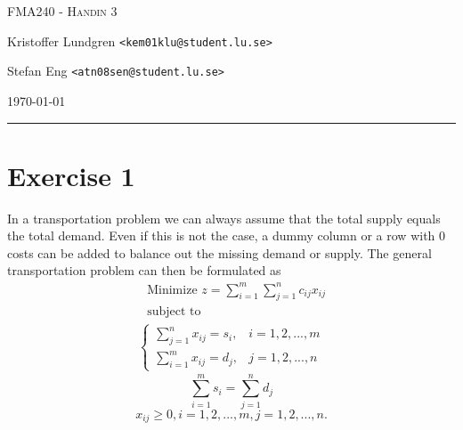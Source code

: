 \documentclass{article}
\begin{document}


\begin{centering}
	{\scshape\Large FMA240 - Handin 3\par}
	\vspace{0.5cm}
	Kristoffer Lundgren \texttt{<kem01klu@student.lu.se>}\par
	Stefan Eng \texttt{<atn08sen@student.lu.se>}\par
    \vspace{0.5cm}
	\today\par
    \rule{\textwidth}{0.4pt}
\end{centering}

\section*{Exercise 1}
  In a transportation problem we can always assume that the total supply equals
  the total demand. Even if this is not the case, a dummy column or a row with
  0 costs can be added to balance out the missing demand or supply.
  The general transportation problem can then be formulated as
  \begin{align*}
  & \text{Minimize } z = \sum_{i=1}^{m}\sum_{j=1}^n c_{ij}x_{ij} \\
  & \text{subject to}
    \label{eq1}
  \end{align*}
  \begin{align}
    \begin{cases}
      \sum_{j=1}^{n} x_{ij} = s_{i}, & i = 1, 2, ..., m \\
      \sum_{i=1}^{m} x_{ij} = d_{j}, & j = 1, 2, ..., n
    \end{cases}
  \end{align}
  \begin{equation}
    \sum_{i=1}^{m} s_{i} = \sum_{j=1}^n d_{j}
    \label{eq3}
  \end{equation}
  \begin{equation}
    x_{ij} \geq 0, i = 1, 2, ..., m, j = 1, 2, ..., n.
    \label{eq4}
  \end{equation}
\end{document}
